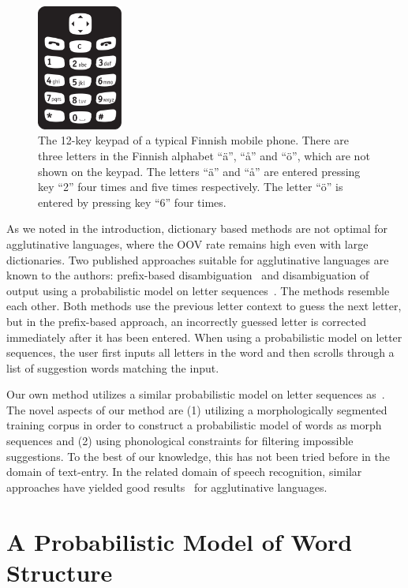 \documentclass{llncs}
\begin{document}
\begin{figure}[hbt!]
\begin{center}
\includegraphics[width=1.1in]{Nappaimet.pdf}
\caption{The 12-key keypad of a typical Finnish mobile phone. There
  are three letters in the Finnish alphabet ``\"{a}'', ``å'' and ``\"{o}'',
  which are not shown on the keypad. The letters ``\"{a}'' and ``å'' are
  entered pressing key ``2'' four times and five times respectively. The
  letter ``\"{o}'' is entered by pressing key ``6'' four
  times.}\label{keypad}
\end{center}
\end{figure}

As we noted in the introduction, dictionary based methods are not
optimal for agglutinative languages, where the OOV rate remains high
even with large dictionaries. Two published approaches suitable for
agglutinative languages are known to the authors: prefix-based
disambiguation~\cite{Mackenzie01letterwise:prefix-based} and
disambiguation of output using a probabilistic model on letter
sequences~\cite{Tantug:2010}. The methods resemble each other. Both
methods use the previous letter context to guess the next letter, but
in the prefix-based approach, an incorrectly guessed letter is
corrected immediately after it has been entered. When using a
probabilistic model on letter sequences, the user first inputs all
letters in the word and then scrolls through a list of suggestion
words matching the input.

Our own method utilizes a similar probabilistic model on letter
sequences as~\cite{Tantug:2010}. The novel aspects of our method are
(1) utilizing a morphologically segmented training corpus in order to
construct a probabilistic model of words as morph sequences and (2)
using phonological constraints for filtering impossible
suggestions. To the best of our knowledge, this has not been tried
before in the domain of text-entry. In the related domain of speech
recognition, similar approaches have yielded good
results~\cite{Creutz_morph-basedspeech} for agglutinative languages.

\section{A Probabilistic Model of Word Structure}\label{model}
\end{document}
